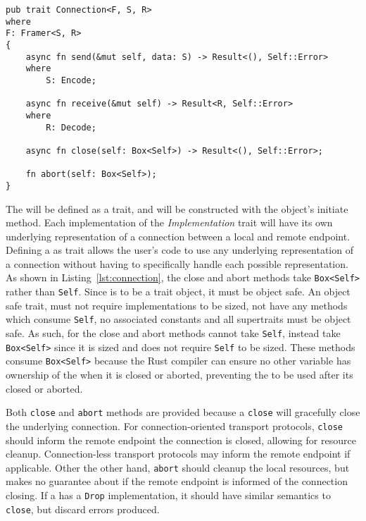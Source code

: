 \begin{lstlisting}[float=h, label=lst:connection, caption={The Connection trait.}]
pub trait Connection<F, S, R>
where
F: Framer<S, R>
{
    async fn send(&mut self, data: S) -> Result<(), Self::Error>
    where
        S: Encode;

    async fn receive(&mut self) -> Result<R, Self::Error>
    where
        R: Decode;

    async fn close(self: Box<Self>) -> Result<(), Self::Error>;

    fn abort(self: Box<Self>);
}
\end{lstlisting}

The \connection{} will be defined as a trait, and will be constructed with the \preconnection{} object's
initiate method.
Each implementation of the \emph{Implementation} trait will have its own underlying representation of a connection
between a local and remote endpoint.
Defining a \connection{} as trait allows the user's code to use any underlying representation of a connection
without having to specifically handle each possible representation.
As shown in Listing~\ref{lst:connection}, the close and abort methods take \texttt{Box<Self>} rather than \texttt{Self}.
Since \connection{} is to be a trait object, it must be object safe.
An object safe trait, must not require implementations to be sized, not have any methods which consume \texttt{Self}, no
associated constants and all supertraits must be object safe.
As such, for the close and abort methods cannot take \texttt{Self}, instead take \texttt{Box<Self>} since it is sized
and does not require \texttt{Self} to be sized.
These methods consume \texttt{Box<Self>} because the Rust compiler can ensure no other variable has ownership of the
\connection{} when it is closed or aborted, preventing the \connection{} to be used after its closed or aborted.

Both \texttt{close} and \texttt{abort} methods are provided because a \texttt{close} will gracefully close the
underlying connection.
For connection-oriented transport protocols, \texttt{close} should inform the remote endpoint the connection
is closed, allowing for resource cleanup.
Connection-less transport protocols may inform the remote endpoint if applicable.
Other the other hand, \texttt{abort} should cleanup the local resources, but makes no guarantee about if the remote
endpoint is informed of the connection closing.
If a \connection{} has a \texttt{Drop} implementation, it should have similar semantics to \texttt{close}, but
discard errors produced.

